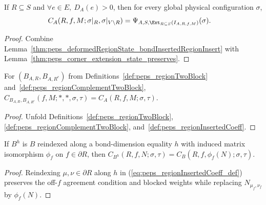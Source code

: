 \begin{lemma}
    \label{thm:peps_regionInsertedCoeff_eq_extendInsert_bondInserted}
    \leanok
    If $R\subseteq S$ and $\forall e\in E,\ D_A(e)>0$, then for every global
    physical configuration $\sigma$,
    \begin{align}
        C_A(R,f,M;\sigma|_R,\sigma|_{V\setminus R})
         & =
        \Psi_{A,S,
            \Ext_{R\subseteq S}(I_{A,R,f,M})}(\sigma).
        \notag
    \end{align}
\end{lemma}
\begin{proof}\leanok
    Combine Lemma~\ref{thm:peps_deformedRegionState_bondInsertedRegionInsert}
    with Lemma~\ref{thm:peps_corner_extension_state_preserves}.
\end{proof}

\begin{lemma}%
    \label{thm:peps_twoBlockInsertedCoeff_eq_regionInsertedCoeff}
    \leanok
    For $(B_{A,R},B_{A,R^c})$ from Definitions~\ref{def:peps_regionTwoBlock}
    and~\ref{def:peps_regionComplementTwoBlock},
    $C_{B_{A,R},B_{A,R^c}}(f,M;*,*,\sigma,\tau)=C_A(R,f,M;\sigma,\tau)$.
\end{lemma}
\begin{proof}\leanok
    Unfold Definitions~\ref{def:peps_regionTwoBlock},
    \ref{def:peps_regionComplementTwoBlock},
    and~\ref{def:peps_regionInsertedCoeff}.
\end{proof}

\begin{lemma}%
    \label{thm:peps_regionInsertedCoeff_reindexTensor}
    \leanok
    If $B^h$ is $B$ reindexed along a bond-dimension equality $h$ with induced
    matrix isomorphism $\phi_f$ on $f\in\partial R$, then
    $C_{B^h}(R,f,N;\sigma,\tau)=C_B(R,f,\phi_f(N);\sigma,\tau)$.
\end{lemma}
\begin{proof}\leanok
    Reindexing $\mu,\nu\in\partial R$ along $h$ in
    (\ref{eq:peps_regionInsertedCoeff_def}) preserves the off-$f$ agreement
    condition and blocked weights while replacing $N_{\mu_f,\nu_f}$ by
    $\phi_f(N)$.
\end{proof}

